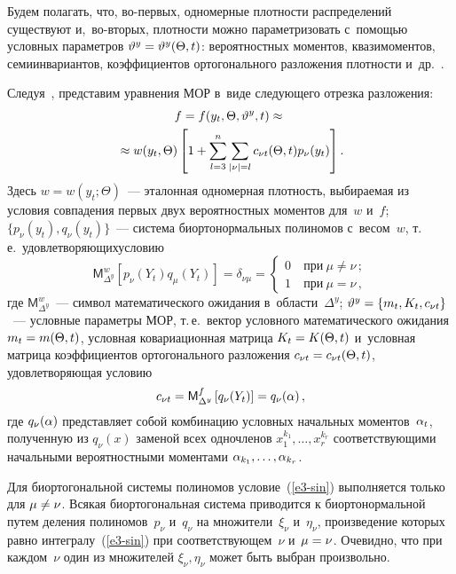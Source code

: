 \begin{multicols}{2}
Будем полагать, что, во-пер\-вых, одномерные плотности распределений существуют
и,~во-вто\-рых, плотности можно параметризовать
с~по\-мощью условных параметров $\vartheta^y \hm=\vartheta^y(\Theta, t)$:
вероятностных моментов, квазимоментов, семиинвариантов, коэффициентов
ортогонального разложения плот\-ности и~др.~\cite{1-sin, 2-sin}.

Следуя~\cite{2-sin}, представим уравнения МОР
 в~виде следующего отрезка разложения:
    \begin{multline}
    f=f(y_t, \Theta, \vartheta^y, t) \approx {}\\
    {}\approx w(y_t, \Theta) \left[ 1 +
    \sum\limits^n_{l=3}\sum\limits_{|\nu |=l} c_{\nu t} (\Theta, t)p_\nu (y_t)\right].
    \label{e2-sin}
    \end{multline}
Здесь  $w=w(y_t; \Theta)$~--- эталонная одномерная плотность,
выбираемая из условия совпадения первых двух вероятностных моментов для~$w$ и~$f$;
$\{p_\nu (y_t) , q_\nu (y_t)\}$~--- система биортонормальных полиномов с~весом~$w$,
т.\,е.\ удовлетворяющих\linebreak условию
   \begin{equation}
    {\mathsf M}^{w}_{\Delta^y}
    \left[ p_\nu (Y_t) q_\mu (Y_t)\right] = \delta_{\nu\mu} =\begin{cases}
    0 &\ \mbox{при}\ \mu\ne \nu\,;\\
    1 &\ \mbox{при}\ \mu=\nu\,,
    \end{cases}
\label{e3-sin}
\end{equation}
где ${\mathsf M}_{\Delta^y}^w$~--- символ математического ожидания
в~об\-ласти~$\Delta^y$; $\vartheta^y \hm= \lf m_t, K_t, c_{\nu t}\rf$~---
условные па\-ра\-мет\-ры МОР, т.\,е.\ вектор условного математического ожидания
$m_t\hm= m(\Theta, t)$, условная ковариационная матрица $K_t\hm=K(\Theta, t)$
и~условная матрица коэффициентов ортогонального разложения
$c_{\nu t}\hm= c_{\nu t}(\Theta, t)$, удовлетворяющая условию
   \begin{equation}
    c_{\nu t} = {\sf M}_{\Delta^y}^f \left[ q_\nu (Y_t)\right] =
    q_\nu (\alpha)\,,\label{e4-sin}
    \end{equation}
где $q_\nu (\alpha)$  представляет собой комбинацию условных начальных
моментов~$\alpha_t$, полученную из $q_\nu (x)$ заменой всех одночленов
$x_1^{k_1}, \ldots , x_r^{k_r}$ соответствующими начальными вероятностными
моментами $\alpha_{k_1}, \ldots,  \alpha_{k_r}$.

Для биортогональной системы полиномов условие~(\ref{e3-sin})
выполняется только для $\mu\hm\ne \nu$. Всякая биортогональная система
приводится к биортонормальной путем деления полиномов~$p_\nu$ и~$q_\nu$ на
множители~$\xi_\nu$ и~$\eta_\nu$, произведение которых равно интегралу~(\ref{e3-sin})
при соответствующем~$\nu$ и~$\mu\hm=\nu$. Очевидно, что при каждом~$\nu$
один из множителей $\xi_\nu,\eta_\nu$ может быть выбран произвольно.


\end{multicols}
